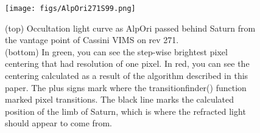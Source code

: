 \documentclass[12pt]{article}
\begin{document}
\begin{figure}[h!]
\centering
\texttt{[image: figs/AlpOri271S99.png]}
\caption{
    (top)
    Occultation light curve as AlpOri passed behind Saturn from the vantage point of Cassini VIMS on rev 271.\\
    (bottom)
    In green, you can see the step-wise brightest pixel centering that had resolution of one pixel.
    In red, you can see the centering calculated as a result of the algorithm described in this paper.
    The plus signs mark where the transitionfinder() function marked pixel transitions.
    The black line marks the calculated position of the limb of Saturn, which is where the refracted light should appear to come from.
}
\label{fig:results}
\end{figure}
\end{document}
